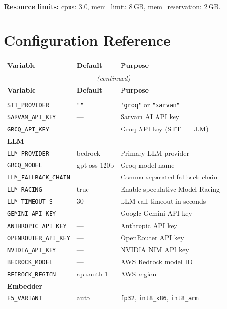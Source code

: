 \documentclass[12pt,a4paper]{article}
\begin{document}
\textbf{Resource limits:} cpus: 3.0, mem\_limit: 8\,GB, mem\_reservation: 2\,GB.


\section{Configuration Reference}

\begin{longtable}{llp{7cm}}
\toprule
\textbf{Variable} & \textbf{Default} & \textbf{Purpose} \\
\midrule
\endfirsthead
\multicolumn{3}{c}{\textit{(continued)}} \\
\toprule
\textbf{Variable} & \textbf{Default} & \textbf{Purpose} \\
\midrule
\endhead
\bottomrule
\endfoot
\multicolumn{3}{l}{\textbf{Speech-to-Text}} \\
\texttt{STT\_PROVIDER}      & \texttt{""} & \texttt{"groq"} or \texttt{"sarvam"} \\
\texttt{SARVAM\_API\_KEY}   & --- & Sarvam AI API key \\
\texttt{GROQ\_API\_KEY}     & --- & Groq API key (STT + LLM) \\
\midrule
\multicolumn{3}{l}{\textbf{LLM}} \\
\texttt{LLM\_PROVIDER}      & bedrock & Primary LLM provider \\
\texttt{GROQ\_MODEL}        & gpt-oss-120b & Groq model name \\
\texttt{LLM\_FALLBACK\_CHAIN} & --- & Comma-separated fallback chain \\
\texttt{LLM\_RACING}        & true & Enable speculative Model Racing \\
\texttt{LLM\_TIMEOUT\_S}    & 30 & LLM call timeout in seconds \\
\texttt{GEMINI\_API\_KEY}   & --- & Google Gemini API key \\
\texttt{ANTHROPIC\_API\_KEY} & --- & Anthropic API key \\
\texttt{OPENROUTER\_API\_KEY} & --- & OpenRouter API key \\
\texttt{NVIDIA\_API\_KEY}   & --- & NVIDIA NIM API key \\
\texttt{BEDROCK\_MODEL}     & --- & AWS Bedrock model ID \\
\texttt{BEDROCK\_REGION}    & ap-south-1 & AWS region \\
\midrule
\multicolumn{3}{l}{\textbf{Embedder}} \\
\texttt{E5\_VARIANT}        & auto & \texttt{fp32}, \texttt{int8\_x86}, \texttt{int8\_arm} \\

\end{longtable}
\end{document}
